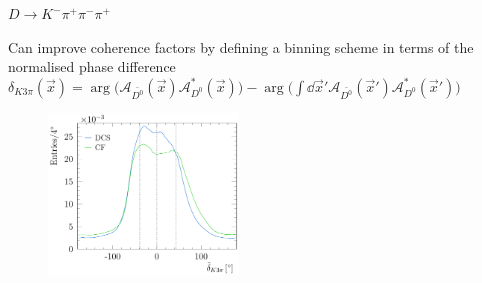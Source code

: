 \documentclass{beamer}
\begin{document}
\begin{frame}{$D\to K^-\pi^+\pi^-\pi^+$}
  \vspace{0.0cm}
  \begin{center}
    {\large Can improve coherence factors by defining a binning scheme in terms of the normalised phase difference $\delta_{K3\pi}(\vec{x}) = \arg\big(\mathcal{A}_{\bar{D^0}}(\vec{x})\mathcal{A}^*_{D^0}(\vec{x})\big) - \arg\Big(\int\dd{\vec{x}'}\mathcal{A}_{\bar{D^0}}(\vec{x}')\mathcal{A}^*_{D^0}(\vec{x}')\Big)$}
  \end{center}
  \vspace{-0.2cm}
  \begin{figure}
    \includegraphics[width=0.45\textwidth]{Figures/K3pi_Binning_Scheme.pdf}
  \end{figure}
  \vspace{-0.5cm}
\end{frame}
\end{document}
